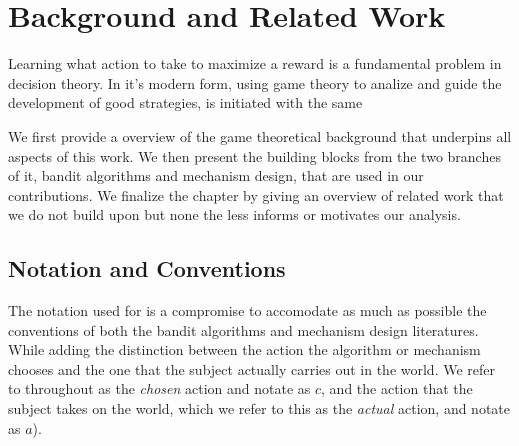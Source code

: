 \chapter{Background and Related Work}
\label{cha:background}





Learning what action to take to maximize a reward is a fundamental problem in decision theory. In it's modern form, using game theory to analize and guide the development of good strategies, is initiated with the same


We first provide a overview of the game theoretical background that underpins all aspects of this work.
We then present the building blocks from the two branches of it, bandit algorithms and mechanism design, that are used in our contributions.
We finalize the chapter by giving an overview of related work that we do not build upon but none the less informs or motivates our analysis.



\section{Notation and Conventions}


The notation used for is a compromise to accomodate as much as possible the conventions of both the bandit algorithms and mechanism design literatures. While adding the distinction between the action the algorithm or mechanism chooses and the one that the subject actually carries out in the world. We refer to throughout as the \emph{chosen} action and notate as $c$, and the action that the subject takes on the world, which we refer to this as the \emph{actual} action, and notate as $a$).


